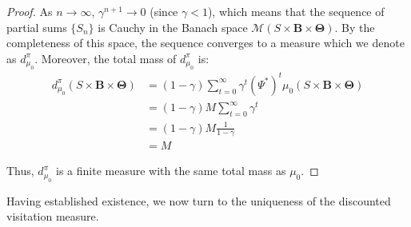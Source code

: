 \begin{proof}
    As $n \to \infty$, $\gamma^{n+1}\to 0$ (since $\gamma < 1$), which means that
    the sequence of partial sums $\{S_{n}\}$ is Cauchy in the Banach space
    $\mathcal{M}(S \times \boldsymbol{B}\times \boldsymbol{\Theta})$. By the completeness
    of this space, the sequence converges to a measure which we denote as
    $d^{\pi}_{\mu_0}$. Moreover, the total mass of $d^{\pi}_{\mu_0}$ is:
    \begin{align}
        d^{\pi}_{\mu_0}(S \times \boldsymbol{B}\times \boldsymbol{\Theta}) & = (1-\gamma) \sum_{t=0}^{\infty}\gamma^{t} (\Psi^{*})^{t} \mu_{0}(S \times \boldsymbol{B}\times \boldsymbol{\Theta}) \\
                                                                           & = (1-\gamma) M \sum_{t=0}^{\infty}\gamma^{t}                                                                         \\
                                                                           & = (1-\gamma) M \frac{1}{1-\gamma}                                                                                    \\
                                                                           & = M
    \end{align}

    Thus, $d^{\pi}_{\mu_0}$ is a finite measure with the same total mass as $\mu_{0}$.
\end{proof}Having established existence, we now turn to the uniqueness of the discounted
visitation measure.

